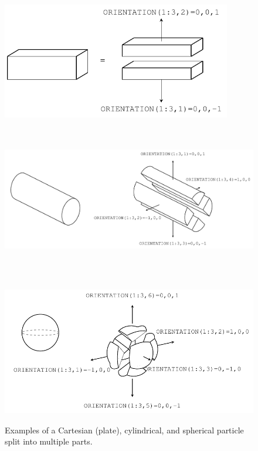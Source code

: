 \documentclass[11pt]{book}
\begin{document}
\begin{figure}[p]
\begin{center}
\includegraphics[height=2.0in]{FIGURES/FDS_User_Guide_Cartesian_Particle_Drawing}

\vspace{0.5in}

\includegraphics[height=2.8in]{FIGURES/FDS_User_Guide_Cylindrical_Particle_Drawing}

\vspace{0.5in}

\includegraphics[height=2.5in]{FIGURES/FDS_User_Guide_Sphere_Particle_Drawing}
\end{center}
\caption[Examples of particle splitting]{Examples of a Cartesian (plate), cylindrical, and spherical particle split into multiple parts.}
\label{part_split}
\end{figure}
\end{document}
